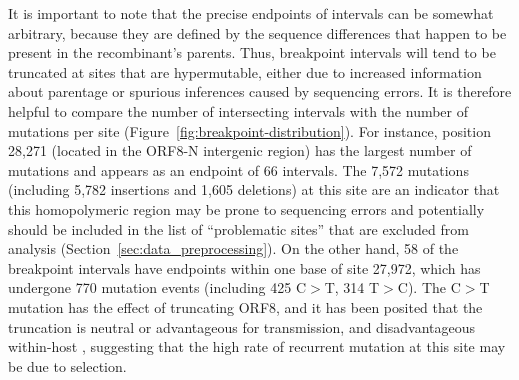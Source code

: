 \documentclass{article}
\begin{document}
It is important to note that the precise endpoints of intervals can be
somewhat arbitrary, because they are defined by the sequence differences
that happen to be present in the recombinant's parents.
Thus, breakpoint intervals will tend to be truncated at sites that are
hypermutable, either due to increased information about parentage
or spurious inferences caused by sequencing errors.
It is therefore helpful to compare the number of intersecting intervals
with the number of mutations per site (Figure~\ref{fig:breakpoint-distribution}).
For instance, position 28,271 (located in the ORF8-N intergenic
region) has the largest number of mutations and appears as an endpoint
of 66 intervals.
The 7,572 mutations (including 5,782 insertions and 1,605 deletions)
at this site are an indicator that this
homopolymeric region may be prone to sequencing errors
and potentially should be included in the list of ``problematic sites'' that
are excluded from analysis (Section~\ref{sec:data_preprocessing}).
On the other hand, 58 of the breakpoint intervals have endpoints
within one base of site 27,972, which has undergone 770 mutation events
(including 425 C$>$T, 314 T$>$C). The C$>$T mutation has the effect of
truncating ORF8, and it has been posited that the truncation is neutral
or advantageous for transmission, and disadvantageous within-host
\citep{Jungreis2021-dh}, suggesting that the high rate of recurrent mutation
at this site may be due to selection.

\end{document}
